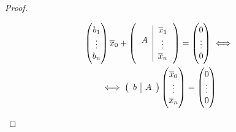 \begin{proof}
\begin{enumerate}[i)]
\begin{gather*}
\begin{pmatrix}
     b_1 \\ \vdots \\ b_n
   \end{pmatrix}
   \overline{x}_0
   +
   \lp
   \begin{tabular}{c|c} 
     \multirow{3}{*}{$A$} & $\overline{x}_1$\\ 
     & $\vdots$  \\ & $ \overline{x}_n$
    \end{tabular} 
    \rp
    =
    \begin{pmatrix}
     0 \\ \vdots \\ 0
   \end{pmatrix}
   \iff \\
   \iff
   \lp
         \begin{array}{c|c} 
           b & A 
         \end{array}
         \rp
         \begin{pmatrix}
           \overline{x}_0 \\
           \vdots \\
           \overline{x}_n
         \end{pmatrix}
 = 
 \begin{pmatrix}
   0 \\ \vdots \\ 0
 \end{pmatrix}
\end{gather*} 
        
   \end{enumerate}

 \end{proof}
 
